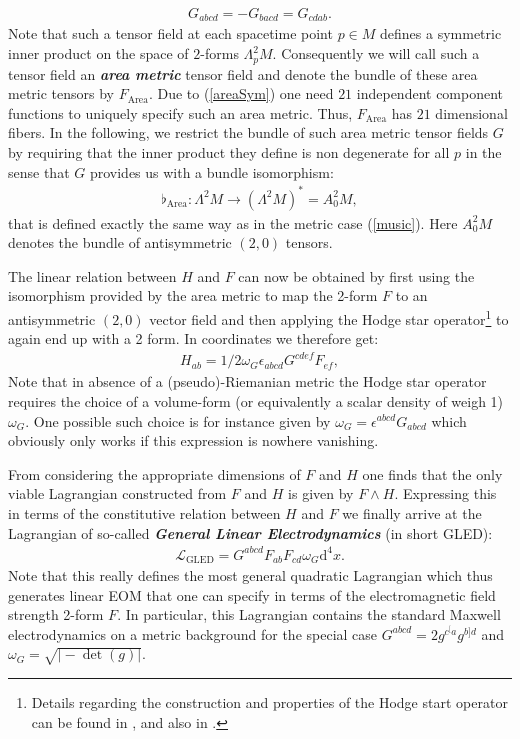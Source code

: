 \begin{align}\label{areaSym}
    G_{abcd} = -G_{bacd} = G_{cdab}.
\end{align}
Note that such a tensor field at each spacetime point $p\in M$ defines a symmetric inner product on the space of $2$-forms $\Lambda^2_pM$. Consequently we will call such a tensor field an \textbf{\textit{area metric}} tensor field and denote the bundle of these area metric tensors by $F_{\text{Area}}$. Due to (\ref{areaSym}) one need $21$ independent component functions to uniquely specify such an area metric. Thus, $F_{\text{Area}}$ has $21$ dimensional fibers. In the following, we restrict the bundle of such area metric tensor fields $G$ by requiring that the inner product they define is non degenerate for all $p$ in the sense that $G$ provides us with a bundle isomorphism: 
\begin{align}
\flat_{\text{Area}} : \Lambda^2M \longrightarrow (\Lambda^2M)^{\ast} = A^2_0M,
\end{align}
that is defined exactly the same way as in the metric case (\ref{music}). Here $A^2_0M$ denotes the bundle of antisymmetric $(2,0)$ tensors. 

The linear relation between $H$ and $F$ can now be obtained by first using the isomorphism provided by the area metric to map the 2-form $F$ to an antisymmetric $(2,0)$ vector field and then applying the Hodge star operator\footnote{Details regarding the construction and properties of the Hodge start operator can be found in \cite{Abraham:1988:MTA:50877}, and also in \cite{nlab:Hodge}.} to again end up with a 2 form. In coordinates we therefore get:
\begin{align}
    H_{ab} = 1/2 \omega_G \epsilon_{abcd} G^{cdef} F_{ef},
\end{align}
Note that in absence of a (pseudo)-Riemanian metric the Hodge star operator requires the choice of a volume-form (or equivalently a scalar density of weigh 1) $\omega_G$. One possible such choice is for instance given by $\omega_G = \epsilon^{abcd}G_{abcd}$ which obviously only works if this expression is nowhere vanishing.

From considering the appropriate dimensions of $F$ and $H$ one finds that the only viable Lagrangian constructed from $F$ and $H$ is given by $F \wedge H$. Expressing this in terms of the constitutive relation between $H$ and $F$ we finally arrive at the Lagrangian of so-called \textbf{\textit{General Linear Electrodynamics}} (in short GLED):
\begin{align}
    \mathcal{L}_{\text{GLED}} =  G^{abcd}F_{ab}F_{cd}\omega_G\mathrm{d}^4x.
\end{align}
Note that this really defines the most general quadratic Lagrangian which thus generates linear EOM that one can specify in terms of the electromagnetic field strength 2-form $F$. In particular, this Lagrangian contains the standard Maxwell electrodynamics on a metric background for the special case $G^{abcd} = 2 g^{c^[a}g^{b]d}$ and $\omega_{G}=\sqrt{\vert -\operatorname{det}(g) \vert}$.

